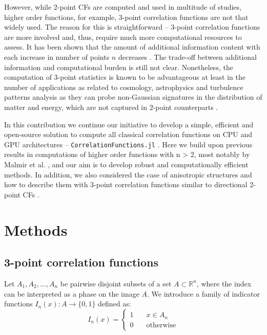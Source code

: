 \documentclass[reprint,amsmath,amssymb,aps,pre,showkeys,showpacs]{revtex4-1}
\newcommand{\code}[1]{\colorbox{light-gray}{\texttt{#1}}}
\newcommand{\highlight}[1]{{\color{red}{#1}}} %
\begin{document}
However, while 2-point CFs are computed and used in multitude of studies, higher
order functions, for example, 3-point correlation functions are not that widely
used. The reason for this is straightforward -- 3-point correlation functions
are more involved and, thus, require much more computational resources to
assess. It has been shown that the amount of additional information content with
each increase in number of points $n$ decreases \cite{yao1993high,Gommes2}. The
trade-off between additional information and computational burden is still not
clear. Nonetheless, the computation of 3-point statistics is known to be
advantageous at least in the number of applications as related to cosmology,
astrophysics and turbulence patterns analysis as they can probe non-Gaussian
signatures in the distribution of matter and energy, which are not captured in
2-point counterparts
\cite{TakadaJain,hopkins2013stars,gorbunova2016precessing,yoo2022non}.


In this contribution we continue our initiative to develop a simple, efficient
and open-source solution to compute all classical correlation functions on CPU
and GPU architectures -- \code{CorrelationFunctions.jl} \cite{CFsjlpaper}. Here
we build upon previous results in computations of higher order functions with n
> 2, most notably by Malmir et al. \cite{malmir2018}, and our aim is to develop
robust and computationally efficient methods. In addition, we also considered
the case of anisotropic structures and how to describe them with 3-point
correlation functions similar to directional 2-point CFs \cite
{10.1063/1.4867611,EPL1}.

\highlight{The paper is organized as follows:}

\section{Methods}
\subsection{3-point correlation functions}
Let $A_1, A_2, \dots, A_n$ be pairwise disjoint subsets of a set
$A \subset \mathbb{R}^n$, where the index can be interpreted as a phase on the
image $A$. We introduce a family of indicator functions
$I_n(x) : A \rightarrow \{0,1\}$ defined as:
\begin{equation}
  I_n(x) = \left\{
  \begin{array}{ll}
    1 & \quad x \in A_n \\
    0 & \quad \text{otherwise}
  \end{array}
  \right.
\end{equation}
\end{document}
